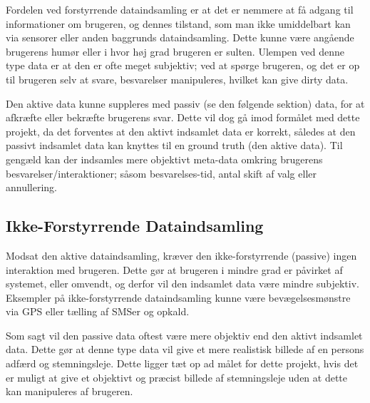 Fordelen ved forstyrrende dataindsamling er at det er nemmere at få adgang til informationer om brugeren, og dennes tilstand, som man ikke umiddelbart kan via sensorer eller anden baggrunds dataindsamling.
Dette kunne være angående brugerens humør eller i hvor høj grad brugeren er sulten.
Ulempen ved denne type data er at den er ofte meget subjektiv; ved at spørge brugeren, og det er op til brugeren selv at svare, besvarelser manipuleres, hvilket kan give dirty data.

Den aktive data kunne suppleres med passiv (se den følgende sektion) data, for at afkræfte eller bekræfte brugerens svar.
Dette vil dog gå imod formålet med dette projekt, da det forventes at den aktivt indsamlet data er korrekt, således at den passivt indsamlet data kan knyttes til en ground truth (den aktive data).
Til gengæld kan der indsamles mere objektivt meta-data omkring brugerens besvarelser/interaktioner; såsom besvarelses-tid, antal skift af valg eller annullering.

\subsection{Ikke-Forstyrrende Dataindsamling}
Modsat den aktive dataindsamling, kræver den ikke-forstyrrende (passive) ingen interaktion med brugeren.
Dette gør at brugeren i mindre grad er påvirket af systemet, eller omvendt, og derfor vil den indsamlet data være mindre subjektiv.
Eksempler på ikke-forstyrrende dataindsamling kunne være bevægelsesmønstre via GPS eller tælling af SMSer og opkald.

Som sagt vil den passive data oftest være mere objektiv end den aktivt indsamlet data.
Dette gør at denne type data vil give et mere realistisk billede af en persons adfærd og stemningsleje.
Dette ligger tæt op ad målet for dette projekt, hvis det er muligt at give et objektivt og præcist billede af stemningsleje uden at dette kan manipuleres af brugeren.
